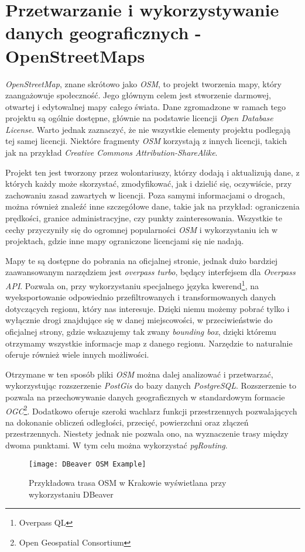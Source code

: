 \section{Przetwarzanie i wykorzystywanie danych geograficznych - OpenStreetMaps}

\par \emph{OpenStreetMap}, znane skrótowo jako \emph{OSM}, to projekt tworzenia mapy, który zaangażowuje społeczność. Jego głównym celem jest stworzenie darmowej, otwartej i edytowalnej mapy całego świata. Dane zgromadzone w ramach tego projektu są ogólnie dostępne, głównie na podstawie licencji \emph{Open Database License}. Warto jednak zaznaczyć, że nie wszystkie elementy projektu podlegają tej samej licencji. Niektóre fragmenty \emph{OSM} korzystają z innych licencji, takich jak na przykład \emph{Creative Commons Attribution-ShareAlike}.

\par Projekt ten jest tworzony przez wolontariuszy, którzy dodają i aktualizują dane, z których każdy może skorzystać, zmodyfikować, jak i dzielić się, oczywiście, przy zachowaniu zasad zawartych w licencji. Poza samymi informacjami o drogach, można również znaleźć inne szczegółowe dane, takie jak na przykład: ograniczenia prędkości, granice administracyjne, czy punkty zainteresowania. Wszystkie te cechy przyczyniły się do ogromnej popularności \emph{OSM} i wykorzystaniu ich w projektach, gdzie inne mapy ograniczone licencjami się nie nadają.

\par Mapy te są dostępne do pobrania na oficjalnej stronie\cite{OPEN_STREET_MAPS_SITE}, jednak dużo bardziej zaawansowanym narzędziem jest \emph{overpass turbo}\cite{OVERPASS_TURBO_SITE}, będący interfejsem dla \emph{Overpass API}. Pozwala on, przy wykorzystaniu specjalnego języka kwerend\footnote{Overpass QL}, na wyeksportowanie odpowiednio przefiltrowanych i transformowanych danych dotyczących regionu, który nas interesuje. Dzięki niemu możemy pobrać tylko i wyłącznie drogi znajdujące się w danej miejscowości, w przeciwieństwie do oficjalnej strony, gdzie wskazujemy  tak zwany \emph{bounding box}, dzięki któremu otrzymamy wszystkie informacje map z danego regionu. Narzędzie to naturalnie oferuje również wiele innych możliwości.

\par Otrzymane w ten sposób pliki \emph{OSM} można dalej analizować i przetwarzać, wykorzystując rozszerzenie \emph{PostGis}\cite{POSTGIS_SITE} do bazy danych \emph{PostgreSQL}\cite{POSTGRESQL_SITE}. Rozszerzenie to pozwala na przechowywanie danych geograficznych w standardowym formacie \emph{OGC}\footnote{Open Geospatial Consortium}. Dodatkowo oferuje szeroki wachlarz funkcji przestrzennych pozwalających na dokonanie obliczeń odległości, przecięć, powierzchni oraz złączeń przestrzennych. Niestety jednak nie pozwala ono, na wyznaczenie trasy między dwoma punktami. W tym celu można wykorzystać \emph{pgRouting}\cite{PGROUTING_SITE}.

\begin{figure}
    \centering
    \texttt{[image: DBeaver OSM Example]}
    \caption{Przykładowa trasa OSM w Krakowie wyświetlana przy wykorzystaniu DBeaver}
    \label{fig:dbeaverOSMExample}
\end{figure}